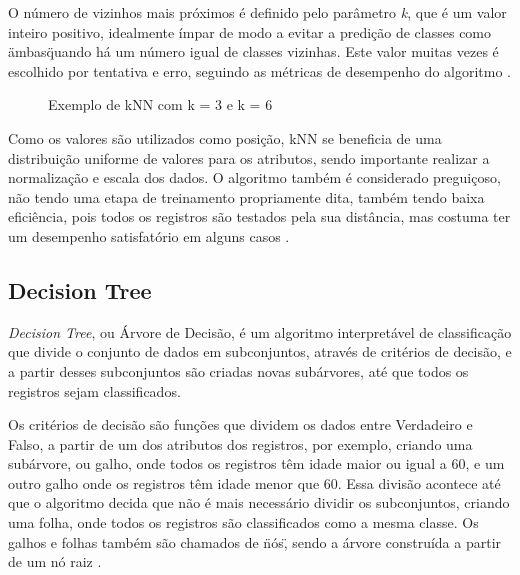 O número de vizinhos mais próximos é definido pelo parâmetro \textit{k}, que é um valor inteiro positivo, idealmente ímpar de modo a evitar a predição de classes como \"ambas\" quando há um número igual de classes vizinhas. Este valor muitas vezes é escolhido por tentativa e erro, seguindo as métricas de desempenho do algoritmo \cite{knn-medium}.

\begin{figure}[ht!]
  \centering
  \caption{\textmd{Exemplo de kNN com k = 3 e k = 6}}
  \label{fig:knn-exemplo}
\end{figure}

Como os valores são utilizados como posição, kNN se beneficia de uma distribuição uniforme de valores para os atributos, sendo importante realizar a normalização e escala dos dados. O algoritmo também é considerado preguiçoso, não tendo uma etapa de treinamento propriamente dita, também tendo baixa eficiência, pois todos os registros são testados pela sua distância, mas costuma ter um desempenho satisfatório em alguns casos \cite{knn-desempenho}.


\subsection{Decision Tree}
\label{subsec:contexto-decision-tree}

\textit{Decision Tree}, ou Árvore de Decisão, é um algoritmo interpretável de classificação que divide o conjunto de dados em subconjuntos, através de critérios de decisão, e a partir desses subconjuntos são criadas novas subárvores, até que todos os registros sejam classificados\cite{dtree}.

Os critérios de decisão são funções que dividem os dados entre Verdadeiro e Falso, a partir de um dos atributos dos registros, por exemplo, criando uma subárvore, ou galho, onde todos os registros têm idade maior ou igual a 60, e um outro galho onde os registros têm idade menor que 60. Essa divisão acontece até que o algoritmo decida que não é mais necessário dividir os subconjuntos, criando uma folha, onde todos os registros são classificados como a mesma classe. Os galhos e folhas também são chamados de \"nós\", sendo a árvore construída a partir de um nó raiz \cite{dtree-explained}.

